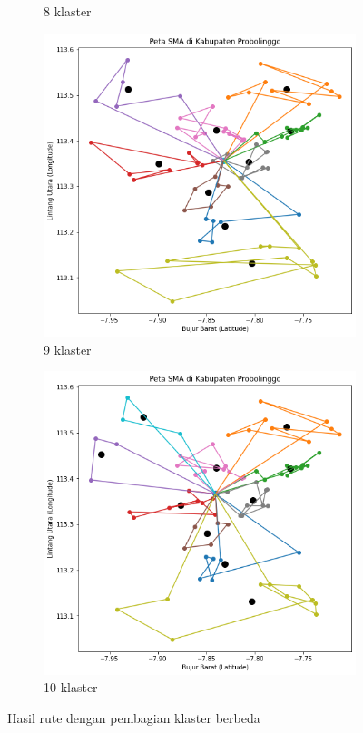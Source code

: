 \begin{figure}[H]
\begin{subfigure}[b]{0.3\textwidth}
		\caption{8 klaster}	
	\end{subfigure}
	\hfill
	\begin{subfigure}[b]{0.3\textwidth}
		\includegraphics[width=\textwidth]{Gambar/Klaster/9.png}
		\caption{9 klaster}	
	\end{subfigure}
	\hfill
	\begin{subfigure}[b]{0.3\textwidth}
		\includegraphics[width=\textwidth]{Gambar/Klaster/10.png}
		\caption{10 klaster}	
	\end{subfigure}
	\caption{Hasil rute dengan pembagian klaster berbeda}
	\label{fig:klasterbeda}
\end{figure}
